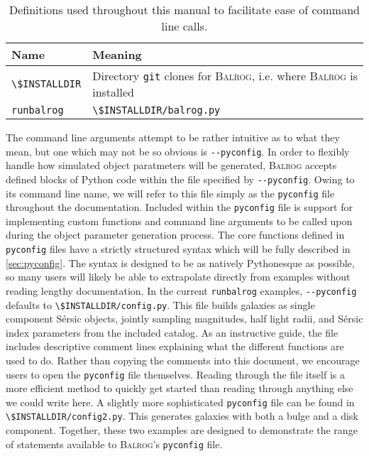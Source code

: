 \documentclass[11pt]{book}
\newcommand{\codett}[1]{\lstinline{#1}}
\newcommand{\py}{Python}
\newcommand{\pyconfig}{\codett{pyconfig}}
\newcommand{\balrog}{\textsc{Balrog}}
\newcommand{\opt}[1]{\codett{--#1}}
\newcommand{\sersic}{S\'{e}rsic}
\begin{document}
\begin{table}
\caption{Definitions used throughout this manual to facilitate ease of command line calls.}
\label{tab:def}
\begin{tabular}{l l}
\toprule %
\rowcolor{gray2} \textbf{Name} & \textbf{Meaning} \\ \midrule
\codett{\$INSTALLDIR} & Directory \codett{git} clones for \balrog{}, i.e. where \balrog{} is installed \\
\codett{runbalrog} & \codett{\$INSTALLDIR/balrog.py} \\ \bottomrule %
\end{tabular}
\end{table}

The command line arguments attempt to be rather intuitive as to what they mean,
but one which may not be so obvious is \opt{pyconfig}.
In order to flexibly handle how simulated object paratmeters will be generated, \balrog{} accepts defined blocks of \py{} code
within the file specified by \opt{pyconfig}.
Owing to its command line name, we will refer to this file simply as the \pyconfig{} file
throughout the documentation.
Included within the \pyconfig{} file is support for implementing custom functions 
and command line arguments to be called upon during the object parameter generation process.
The core functions defined in \pyconfig{} files have a strictly
structured syntax which will be fully described in \autoref{sec:pyconfig}. 
The syntax is designed to be as natively \py{}esque as possible, so
many users will likely be able to extrapolate directly from examples without reading lengthy documentation. 
In the current \codett{runbalrog} examples, \opt{pyconfig} defaults to \codett{\$INSTALLDIR/config.py}.
This file builds galaxies as single component \sersic{} objects, 
jointly sampling magnitudes, half light radii, and \sersic{} index parameters from the included catalog.
As an instructive guide, the file includes descriptive comment lines explaining what the different functions are used to do.
Rather than copying the comments into this document, we encourage users to open the \pyconfig{} file themselves.
Reading through the file itself is a more efficient method to quickly get started than
reading through anything else we could write here.
A slightly more sophisticated \pyconfig{} file can be found in \codett{\$INSTALLDIR/config2.py}.
This generates galaxies with both a bulge and a disk component.
Together, these two examples are designed to demonstrate the range of statements available to 
\balrog{}'s \pyconfig{} file.
\end{document}
